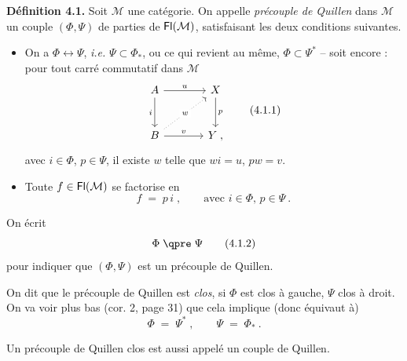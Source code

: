 \textbf{Définition 4.1.} Soit $\mathcal{M}$ une catégorie. On appelle \textit{précouple de Quillen} dans $\mathcal{M}$ un couple $(\Phi,\Psi)$ de parties de $\mathsf{Fl}(\mathcal{M})$, satisfaisant les deux conditions suivantes.
\begin{itemize}[leftmargin=2.5em]
\item[\textit{a})] On a $\Phi\longleftrightarrow\Psi$, \textit{i.e.} $\Psi\subset\Phi_*$, ou ce qui revient au même, $\Phi\subset\Psi^*$ -- soit encore : pour tout carré commutatif dans $\mathcal{M}$
\[
\begin{tikzcd}[row sep=large, column sep=large]
A \arrow[r, "u"] \arrow[d, "i"'] & X \arrow[d, "p"] \\
B \arrow[ur, dotted, "w" description] \arrow[r, "v"] & Y \;,
\end{tikzcd}
\tag*{(4.1.1)}
\]
avec $i\in\Phi$, $p\in\Psi$, il existe $w$ telle que $wi=u$, $pw=v$.
\item[\textit{b})] Toute $f\in\mathsf{Fl}(\mathcal{M})$ se factorise en
\[
f \;=\; p\,i\;, \qquad \text{avec } i\in\Phi,\, p\in\Psi\ .
\]
\end{itemize}
On écrit
\[
\Phi \;\qpre\; \Psi
\tag*{(4.1.2)}
\] %
pour indiquer que $(\Phi,\Psi)$ est un précouple de Quillen.

On dit que le précouple de Quillen est \textit{clos}, si $\Phi$ est clos à gauche, $\Psi$ clos à droit. On va voir plus bas (cor. 2, page 31) que cela implique (donc équivaut à) %
\[
\Phi \;=\; \Psi^*\;, \qquad \Psi \;=\; \Phi_*\ .
\tag*{(4.1.3)}
\]

Un précouple de Quillen clos est aussi appelé un couple de Quillen.

